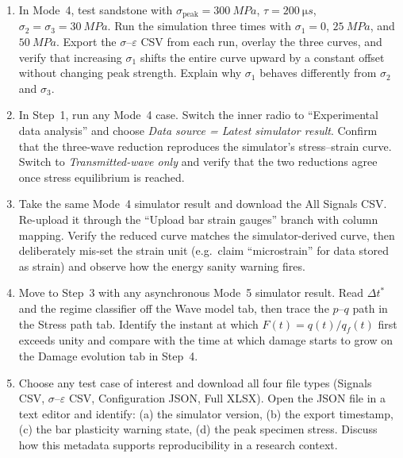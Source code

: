 \documentclass[11pt,a4paper,openany]{book}
\providecommand{\SI}[2]{\qty{#1}{#2}}
\theoremstyle{handbook}
\newcommand{\sig}{\sigma}
\newcommand{\eps}{\varepsilon}
\newcommand{\sigpeak}{\sig_{\text{peak}}}
\begin{document}
\begin{enumerate}[leftmargin=*,itemsep=4pt]
        proportional to $\sigpeak^{+}-\sigpeak^{-}$. At what amplitude
        ratio does this degenerate into Mode~4 (one-sided) behaviour?
  \item In Mode~4, test sandstone with $\sigpeak=\SI{300}{MPa}$,
        $\tau=\SI{200}{\micro s}$, $\sig_2=\sig_3=\SI{30}{MPa}$. Run the
        simulation three times with $\sig_1=0$, $\SI{25}{MPa}$, and
        $\SI{50}{MPa}$. Export the $\sig$--$\eps$ CSV from each run,
        overlay the three curves, and verify that increasing $\sig_1$
        shifts the entire curve upward by a constant offset without
        changing peak strength. Explain why $\sig_1$ behaves differently
        from $\sig_2$ and $\sig_3$.
  \item In Step~1, run any Mode~4 case. Switch the inner radio to
        ``Experimental data analysis'' and choose \emph{Data source =
        Latest simulator result}. Confirm that the three-wave reduction
        reproduces the simulator's stress--strain curve. Switch to
        \emph{Transmitted-wave only} and verify that the two reductions
        agree once stress equilibrium is reached.
  \item Take the same Mode~4 simulator result and download the All
        Signals CSV. Re-upload it through the ``Upload bar strain
        gauges'' branch with column mapping. Verify the reduced curve
        matches the simulator-derived curve, then deliberately mis-set
        the strain unit (e.g.\ claim ``microstrain'' for data stored as
        strain) and observe how the energy sanity warning fires.
  \item Move to Step~3 with any asynchronous Mode~5 simulator result.
        Read $\Delta t^{\ast}$ and the regime classifier off the Wave
        model tab, then trace the $p$--$q$ path in the Stress path tab.
        Identify the instant at which $F(t)=q(t)/q_f(t)$ first exceeds
        unity and compare with the time at which damage starts to grow
        on the Damage evolution tab in Step~4.
  \item Choose any test case of interest and download all four file
        types (Signals CSV, $\sig$--$\eps$ CSV, Configuration JSON, Full
        XLSX). Open the JSON file in a text editor and identify:
        (a) the simulator version, (b) the export timestamp, (c) the bar
        plasticity warning state, (d) the peak specimen stress. Discuss
        how this metadata supports reproducibility in a research
        context.
\end{enumerate}

\backmatter

\printbibliography[heading=bibintoc,title={References}]
\end{document}
